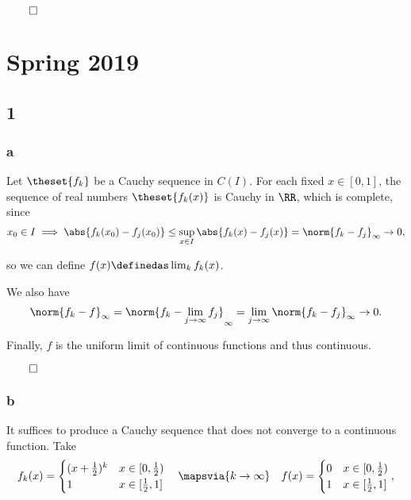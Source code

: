 \(\qed\)

\hypertarget{spring-2019}{%
\section{Spring 2019}\label{spring-2019}}

\hypertarget{section}{%
\subsection{1}\label{section}}

\hypertarget{a}{%
\subsubsection{a}\label{a}}

Let \(\theset{f_k}\) be a Cauchy sequence in \(C(I)\). For each fixed
\(x\in [0, 1]\), the sequence of real numbers \(\theset{f_k(x)}\) is
Cauchy in \(\RR\), which is complete, since
\begin{align*}
x_0\in I \implies \abs{f_k(x_0) - f_j(x_0)} \leq \sup_{x\in I} \abs{f_k(x) - f_j(x)} = \norm{f_k - f_j}_\infty \to 0,
\end{align*}

so we can define \(f(x) \definedas \lim_k f_k(x)\).

We also have \begin{align*}
\norm{f_k - f}_\infty
= \norm{f_k - \lim_{j\to\infty} f_j}_\infty 
= \lim_{j\to\infty} \norm{f_k - f_j}_\infty 
\to 0
.\end{align*}

Finally, \(f\) is the uniform limit of continuous functions and thus
continuous.

\(\qed\)

\hypertarget{b}{%
\subsubsection{b}\label{b}}

It suffices to produce a Cauchy sequence that does not converge to a
continuous function. Take \begin{align*}
f_k(x) = 
\begin{cases}
(x + \frac 1 2)^k & x \in [0, \frac 1 2) \\
1 & x \in [\frac 1 2, 1]
\end{cases}
\quad \mapsvia{k\to\infty} \quad
f(x) = 
\begin{cases}
0 & x \in [0, \frac 1 2) \\
1 & x \in [\frac 1 2, 1]
\end{cases}
,\end{align*}

